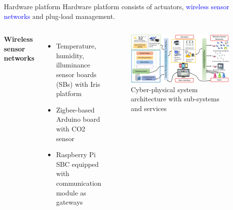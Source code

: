 \documentclass[aspectratio=169]{beamer}
\begin{document}
\begin{frame}{Hardware platform}
    Hardware platform consists of actuators, \textcolor{blue}{wireless sensor networks} and plug-load management.
    \begin{columns}
        \textbf{Wireless sensor networks}
        \small{
            \begin{itemize}[label=$\circ$]
                \item Temperature, humidity, illuminance sensor boards (SBs) with Iris platform
                \item Zigbee-based Arduino board with CO2 sensor
                \item Raspberry Pi SBC equipped with communication module as gateways
            \end{itemize}
        }
        
        \begin{figure}
            \includegraphics[scale=0.2]{pic/cyber-physical-infrastructure.png}
            \caption{\footnotesize{Cyber-physical system architecture with sub-systems and services}}
        \end{figure}
    \end{columns}
\end{frame}
\end{document}
